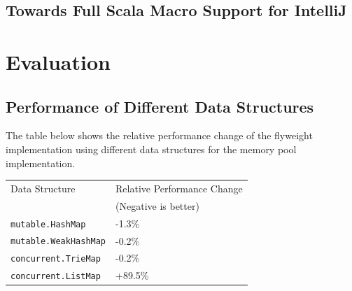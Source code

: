 \documentclass[11pt]{article}
\begin{document}


    \subsection{Towards Full Scala Macro Support for IntelliJ}


    \newpage
    \section{Evaluation}


    \subsection{Performance of Different Data Structures}
    

    The table below shows the relative performance change of the flyweight implementation
    using different data structures for the memory pool implementation.

    \begin{center}
        \begin{tabular}{ ll } 
        \hline
        Data Structure & Relative Performance Change \\ 
        & (Negative is better) \\
        \hline
        \texttt{mutable.HashMap} & -1.3\% \\ 
        \texttt{mutable.WeakHashMap} & -0.2\% \\
        \texttt{concurrent.TrieMap} & -0.2\% \\
        \texttt{concurrent.ListMap} & +89.5\% \\ 
        \hline
        \end{tabular}
    \end{center}
\end{document}
